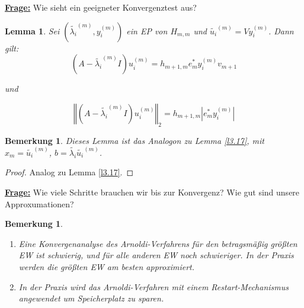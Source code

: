 \documentclass{book}
\newtheorem{lemma}[algorithm]{Lemma}
\newtheorem{remark}[algorithm]{Bemerkung}
\begin{document}
            \underline{\textbf{Frage:}} Wie sieht ein geeigneter Konvergenztest aus?

            \begin{lemma}\label{l4.37}
                Sei $(\tilde{\lambda_i}^{(m)},y_i^{(m)})$ ein EP von $H_{m,m}$ und $\tilde{u_i}^{(m)}=Vy_i^{(m)}$.
                Dann gilt:
                \begin{equation*}
                    (A-\tilde{\lambda_i}^{(m)}I)u_i^{(m)}=h_{m+1,m}e_m^* y_i^{(m)}v_{m+1} 
                \end{equation*}

                und 

                \begin{equation*}
                    \left\Vert  (A-\tilde{\lambda_i}^{(m)}I)u_i^{(m)}\right\Vert_2=h_{m+1,m}\left\vert e_m^*y_i^{(m)} \right\vert 
                \end{equation*}
            \end{lemma}

            \begin{remark}\label{b4.38}
                Dieses Lemma ist  das Analogon zu Lemma \ref{l3.17},
                mit $x_m=\tilde{u_i}^{(m)}$, $b=\tilde{\lambda_i}\tilde{u_i}^{(m)}$.
            \end{remark}

            \begin{proof}
                Analog zu Lemma \ref{l3.17}.
            \end{proof}

            \underline{\textbf{Frage:}} Wie viele Schritte brauchen wir bis zur Konvergenz? Wie gut sind 
            unsere Approxumationen?

            \begin{remark}\label{b4.39}
                \begin{enumerate}
                    \item Eine Konvergenanalyse des Arnoldi-Verfahrens für den betragsmäßig größten EW ist schwierig, und für 
                        alle anderen EW noch schwieriger. In der Praxis werden die größten EW am besten approximiert.
                    \item In der Praxis wird das Arnoldi-Verfahren mit einem Restart-Mechanismus angewendet um Speicherplatz zu sparen. 
                \end{enumerate}
            \end{remark}
\end{document}
